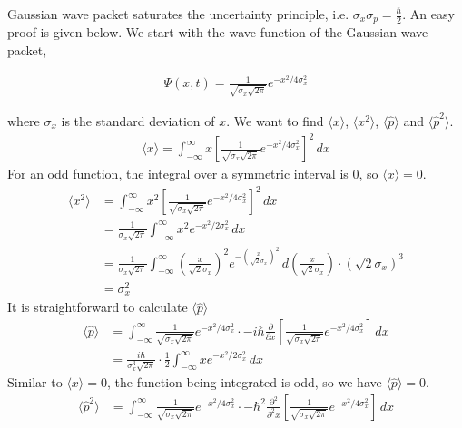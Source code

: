 \documentclass[12pt]{book} %
\numberwithin{equation}{chapter}
\def\s{\sigma}
\def\p{\partial}
\begin{document}
\begin{example}
\label{Gaussian wave packet}
Gaussian wave packet saturates the uncertainty principle, i.e. $\s_{x}\s_{p}=\frac{\hbar}{2}$. An easy proof is given below.\bigskip\newline
We start with the wave function of the Gaussian wave packet,
\begin{eqnbox}
\begin{align}
\Psi(x,t)=\frac{1}{\sqrt{\s_{x}\sqrt{2\pi}}}e^{-x^{2}/4\s_{x}^{2}}
\end{align}
\end{eqnbox}
where $\s_{x}$ is the standard deviation of $x$.\bigskip\newline
We want to find $\langle x\rangle$, $\langle x^{2}\rangle$, $\langle \hat{p}\rangle$ and $\langle \hat{p}^{2}\rangle$.
\begin{align*}
\langle x\rangle=\int_{-\infty}^{\infty}x{\left[\frac{1}{\sqrt{\s_{x}\sqrt{2\pi}}}e^{-x^{2}/4\s_{x}^{2}}\right]}^{2} \,dx
\end{align*}
For an odd function, the integral over a symmetric interval is $0$, so $\langle x\rangle=0$.
\begin{align*}
\langle x^{2}\rangle&=\int_{-\infty}^{\infty}x^{2}{\left[\frac{1}{\sqrt{\s_{x}\sqrt{2\pi}}}e^{-x^{2}/4\s_{x}^{2}}\right]}^{2}\,dx\\
&=\frac{1}{\s_{x}\sqrt{2\pi}}\int_{-\infty}^{\infty}x^{2}e^{-x^{2}/2\s_{x}^{2}}\,dx\\
&=\frac{1}{\s_{x}\sqrt{2\pi}}\int_{-\infty}^{\infty}{\left(\frac{x}{\sqrt{2}\s_{x}}\right)}^{2}e^{-{\left(\frac{x}{\sqrt{2}\s_{x}}\right)}^{2}}\,d\left(\frac{x}{\sqrt{2}\s_{x}}\right)\cdot{\left(\sqrt{2}\s_{x}\right)}^{3}\\
&=\s_{x}^{2}
\end{align*}
It is straightforward to calculate $\langle \hat{p}\rangle$
\begin{align*}
\langle \hat{p}\rangle&=\int_{-\infty}^{\infty}\frac{1}{\sqrt{\s_{x}\sqrt{2\pi}}}e^{-x^{2}/4\s_{x}^{2}}\cdot -i\hbar\frac{\p}{\p x}\left[\frac{1}{\sqrt{\s_{x}\sqrt{2\pi}}}e^{-x^{2}/4\s_{x}^{2}}\right]\,dx\\
&=\frac{i\hbar}{\s_{x}^{3}\sqrt{2\pi}}\cdot\frac{1}{2}\int_{-\infty}^{\infty} xe^{-x^{2}/2\s_{x}^{2}}\,dx
\end{align*}
Similar to $\langle x\rangle=0$, the function being integrated is odd, so we have $\langle \hat{p}\rangle=0$.
\begin{align*}
\langle \hat{p}^{2}\rangle&=\int_{-\infty}^{\infty}\frac{1}{\sqrt{\s_{x}\sqrt{2\pi}}}e^{-x^{2}/4\s_{x}^{2}}\cdot -{\hbar}^{2}\frac{\p^2}{\p^2 x}\left[\frac{1}{\sqrt{\s_{x}\sqrt{2\pi}}}e^{-x^{2}/4\s_{x}^{2}}\right]\,dx\\

\end{align*}
\end{example}
\end{document}
